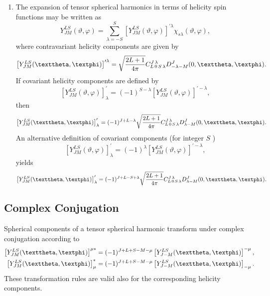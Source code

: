 \begin{enumerate}[label=(\alph*)]
\item The expansion of tensor spherical harmonics in terms of helicity spin functions may be written as
\begin{equation}
Y_{J M}^{L S}(\vartheta, \varphi)=\sum_{\lambda=-S}^{S}\left[Y_{J M}^{L S}(\vartheta, \varphi)\right]^{\prime \lambda} \chi_{s \lambda}(\vartheta, \varphi), \label{eq:7:1:10}
\end{equation}
where contravariant helicity components are given by
\begin{equation}
\left[Y_{J M}^{L S}(\vartheta, \varphi)\right]^{\prime \lambda}=\sqrt{\frac{2 L+1}{4 \pi}} \clebsch{L}{0}{S}{\lambda}{J}{\lambda} D_{-\lambda-M}^{J}(0, \vartheta, \varphi). \label{eq:7:1:11}
\end{equation}
If covariant helicity components are defined by
\begin{equation}
\left[Y_{J M}^{L S}(\vartheta, \varphi)\right]_{\lambda}^{\prime}=(-1)^{S-\lambda}\left[Y_{J M}^{L S}(\vartheta, \varphi)\right]^{\prime-\lambda}, \label{eq:7:1:12}
\end{equation}
then
\begin{equation}
\left[Y_{J M}^{L S}(\vartheta, \varphi)\right]_{\lambda}^{\prime}=(-1)^{J+L-\lambda} \sqrt{\frac{2 L+1}{4 \pi}} \clebsch{L}{0}{S}{\lambda}{J}{\lambda} D_{\lambda-M}^{J}(0, \vartheta, \varphi). \label{eq:7:1:13}
\end{equation}
An alternative definition of covariant components (for integer $S$ )
\begin{equation}
\left[Y_{J M}^{L S}(\vartheta, \varphi)\right]_{\lambda}^{\prime}=(-1)^{\lambda}\left[Y_{J M}^{L S}(\vartheta, \varphi)\right]^{\prime-\lambda}, \label{eq:7:1:14}
\end{equation}
yields
\begin{equation}
\left[Y_{J M}^{L S}(\vartheta, \varphi)\right]_{\lambda}^{\prime}=(-1)^{J+L-S+\lambda} \sqrt{\frac{2 L+1}{4 \pi}} \clebsch{L}{0}{S}{\lambda}{J}{\lambda} D_{\lambda-M}^{J}(0, \vartheta, \varphi) . \label{eq:7:1:15}
\end{equation}
\end{enumerate}

\subsection{Complex Conjugation}\label{sec:7.1.3}
Spherical components of a tensor spherical harmonic transform under complex conjugation according to
\begin{align}
{\left[Y_{J M}^{L S}(\vartheta, \varphi)\right]^{\mu *} } & =(-1)^{J+L+S-M-\mu}\left[Y_{J-M}^{L S}(\vartheta, \varphi)\right]^{-\mu}, \notag\\
{\left[Y_{J M}^{L S}(\vartheta, \varphi)\right]_{\mu}^{*} } & =(-1)^{J+L+S-M-\mu}\left[Y_{J-M}^{L S}(\vartheta, \varphi)\right]_{-\mu}. \label{eq:7:1:16}
\end{align}
These transformation rules are valid also for the corresponding helicity components.

